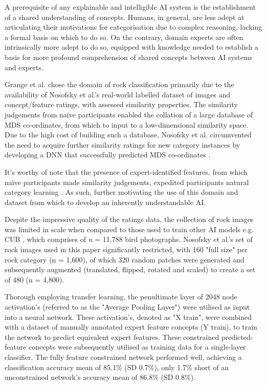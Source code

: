 A prerequisite of any explainable and intelligible AI system is the establishment of a shared understanding of concepts. Humans, in general, are less adept at articulating their motivations for categorisation due to complex reasoning, lacking a formal basis on which to do so. On the contrary, domain experts are often intrinsically more adept to do so, equipped with knowledge needed to establish a basis for more profound comprehension of shared concepts between AI systems and experts.

Grange et al. chose the domain of rock classification primarily due to the availability of Nosofsky et al.'s real-world labelled dataset of images and concept/feature ratings, with assessed similarity properties. The similarity judgements from naïve participants enabled the collation of a large database of MDS co-ordinates, from which to input to a low-dimensional similarity space. Due to the high cost of building such a database, Nosofsky et al. circumvented the need to acquire further similarity ratings for new category instances by developing a DNN that successfully predicted MDS co-ordinates \cite{sandersTrainingDeepNetworks2020}.

It's worthy of note that the presence of expert-identified features, from which naïve participants made similarity judgements, expedited participants natural category learning \cite{miyatsuFeatureHighlightingEnhances2019}. As such, further motivating the use of this domain and dataset from which to develop an inherently understandable AI. 

Despite the impressive quality of the ratings data, the collection of rock images was limited in scale when compared to those used to train other AI models e.g. CUB \cite{wahCaltechUCSDBirds2002011Dataset2011}, which comprises of \emph{n} = 11,788 bird photographs. Nosofsky et al.'s set of rock images used in this paper significantly restricted, with 160 "full size" per rock category (n = 1,600), of which 320 random patches were generated and subsequently augmented (translated, flipped, rotated and scaled) to create a set of 480 (n = 4,800).

Thorough employing transfer learning, the penultimate layer of 2048 node activation's (referred to as the "Average Pooling Layer") were  utilised as input into a neural network. These activation's, denoted as  "X train", were combined with a dataset of manually annotated expert feature concepts (Y train), to train the network to predict equivalent expert features. These constrained predicted-feature concepts were subsequently utilised as training data for a single-layer classifier. The fully feature constrained network performed well, achieving a classification accuracy mean of 85.1\% (SD 0.7\%), only 1.7\% short of an unconstrained network’s accuracy mean of 86.8\% (SD 0.8\%).

